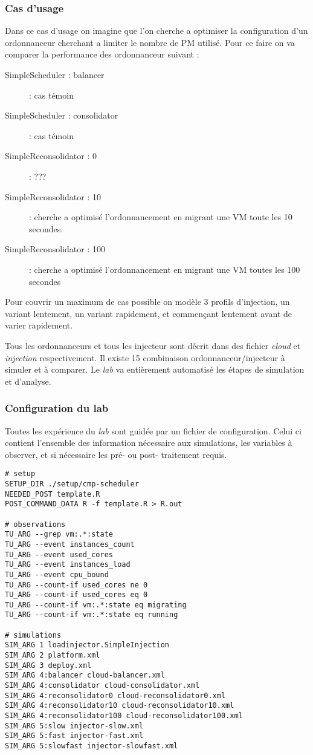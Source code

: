 \documentclass[parallelisme]{compas2017}
\begin{document}
\subsubsection{Cas d'usage}

Dans ce cas d'usage on imagine que l'on cherche a optimiser la configuration d'un
ordonnanceur cherchant a limiter le nombre de PM utilisé. Pour ce faire on va
comparer la performance des ordonnanceur suivant : 
\begin{description}
	\item[SimpleScheduler : balancer] : cas témoin
	\item[SimpleScheduler : consolidator] : cas témoin
	\item[SimpleReconsolidator : 0 ] : ???
	\item[SimpleReconsolidator : 10] : cherche a optimisé l'ordonnancement
		en migrant une VM toute les 10 secondes.
	\item[SimpleReconsolidator : 100] : cherche a optimisé l'ordonnancement
		en migrant une VM toutes les 100 secondes
\end{description}

Pour couvrir un maximum de cas possible on modèle 3 profils d'injection, un
variant lentement, un variant rapidement, et commençant lentement avant de
varier rapidement.

Tous les ordonnanceurs et tous les injecteur sont décrit dans des fichier
\emph{cloud} et \emph{injection} respectivement. Il existe 15 combinaison
ordonnanceur/injecteur à simuler et à comparer. Le \emph{lab} va entièrement
automatisé les étapes de simulation et d'analyse.

\subsubsection{Configuration du lab}

Toutes les expérience du \emph{lab} sont guidée par un fichier de configuration.
Celui ci contient l'ensemble des information nécessaire aux simulations, les
variables à observer, et si nécessaire les pré- ou post- traitement requis. 

\begin{verbatim}
# setup
SETUP_DIR ./setup/cmp-scheduler
NEEDED_POST template.R
POST_COMMAND_DATA R -f template.R > R.out

# observations
TU_ARG --grep vm:.*:state
TU_ARG --event instances_count 
TU_ARG --event used_cores
TU_ARG --event instances_load 
TU_ARG --event cpu_bound
TU_ARG --count-if used_cores ne 0
TU_ARG --count-if used_cores eq 0
TU_ARG --count-if vm:.*:state eq migrating
TU_ARG --count-if vm:.*:state eq running

# simulations
SIM_ARG 1 loadinjector.SimpleInjection
SIM_ARG 2 platform.xml 
SIM_ARG 3 deploy.xml
SIM_ARG 4:balancer cloud-balancer.xml
SIM_ARG 4:consolidator cloud-consolidator.xml
SIM_ARG 4:reconsolidator0 cloud-reconsolidator0.xml
SIM_ARG 4:reconsolidator10 cloud-reconsolidator10.xml 
SIM_ARG 4:reconsolidator100 cloud-reconsolidator100.xml
SIM_ARG 5:slow injector-slow.xml
SIM_ARG 5:fast injector-fast.xml
SIM_ARG 5:slowfast injector-slowfast.xml 
\end{verbatim}
\end{document}
